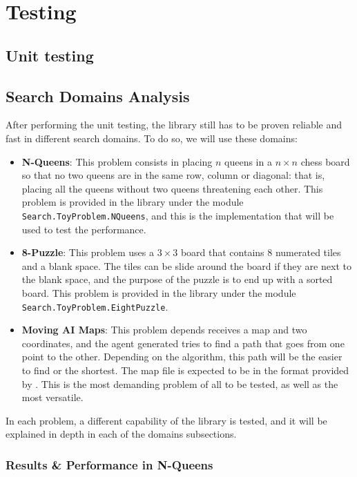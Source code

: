 \section{Testing}

\subsection{Unit testing}

\subsection{Search Domains Analysis}

After performing the unit testing, the library still has to be proven reliable
and fast in different search domains. To do so, we will use these domains:

\begin{itemize}
\item \textbf{N-Queens}: This problem consists in placing $n$ queens in a $n
  \times n$ chess board so that no two queens are in the same row, column or
  diagonal: that is, placing all the queens without two queens threatening each
  other. This problem is provided in the library under the module
  \texttt{Search.ToyProblem.NQueens}, and this is the implementation that will
  be used to test the performance.
\item \textbf{8-Puzzle}: This problem uses a $3 \times 3$ board that contains 8
  numerated tiles and a blank space. The tiles can be slide around the board if
  they are next to the blank space, and the purpose of the puzzle is to end up
  with a sorted board. This problem is provided in the library under the module
  \texttt{Search.ToyProblem.EightPuzzle}.
\item \textbf{Moving AI Maps}: This problem depends receives a map and two
  coordinates, and the agent generated tries to find a path that goes from one
  point to the other. Depending on the algorithm, this path will be the easier
  to find or the shortest. The map file is expected to be in the format
  provided by \cite{movingai-benchmarks}. This is the most demanding problem of
  all to be tested, as well as the most versatile.
\end{itemize}

In each problem, a different capability of the library is tested, and it will
be explained in depth in each of the domains subsections.\\

\subsubsection{Results \& Performance in N-Queens}

